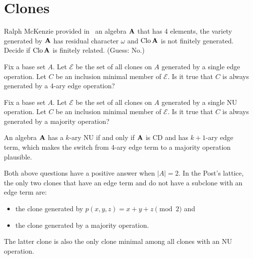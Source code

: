 \section{Clones}
\begin{question} Ralph McKenzie provided
  in~\cite{mckenzie-residual-bounds} an algebra
  ${\mathbf{A}}$ that has 4 elements, the variety generated by ${\mathbf{A}}$ has residual
  character $\omega$ and $\operatorname{Clo} {\mathbf{A}}$ is not finitely generated. Decide if
  $\operatorname{Clo} {\mathbf{A}}$ is finitely related. (Guess: No.)
\end{question}

\begin{question} Fix a base set $A$. Let $\mathcal E$ 
  be the set of all clones on $A$ generated by a single edge operation. Let $C$
  be an inclusion minimal member of $\mathcal E$. Is it true that $C$ is always
  generated by a 4-ary edge operation?
\end{question}
\begin{question} Fix a base set $A$. Let $\mathcal E$ 
  be the set of all clones on $A$ generated by a single NU operation. Let $C$
  be an inclusion minimal member of $\mathcal E$. Is it true that $C$ is always
  generated by a majority operation?
\end{question}

\begin{context}
  An algebra ${\mathbf{A}}$ has a $k$-ary NU if and only if ${\mathbf{A}}$ is CD and has
  $k+1$-ary edge term, which makes the switch from 4-ary edge term to a
  majority operation plausible.

  Both above questions have a positive answer when $|A|=2$. In the Post's
  lattice, the only two clones that have an edge term and do not have a subclone
  with an edge term are:
  \begin{itemize}
    \item the clone generated by $p(x,y,z)=x+y+z\pmod 2$ and
    \item the clone generated by a majority operation.
  \end{itemize}
  The latter clone is also the only clone minimal among all clones with an NU operation.
\end{context}

